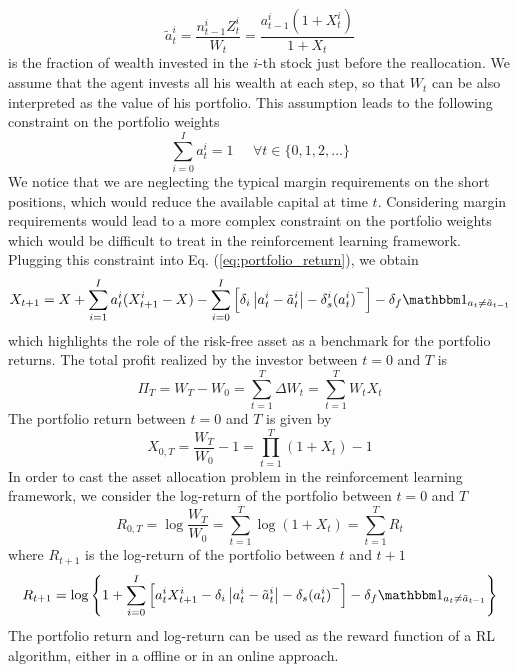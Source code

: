 \begin{equation*}
	\tilde{a}_t^i = \frac{n_{t-1}^i Z_t^i}{W_t} = \frac{a_{t-1}^i (1+X_t^i)}
	{1 + X_t}
\end{equation*}
is the fraction of wealth invested in the $i$-th stock just before the 
reallocation. We assume that the agent invests all his wealth at each step, so 
that $W_t$ can be also interpreted as the value of his portfolio. This 
assumption leads to the following constraint on the portfolio weights
\begin{equation}
	\sum^{I}_{i=0} a_t^i = 1 \;\;\;\;\; \forall t \in \{0, 1, 2, \ldots\}
\end{equation}
We notice that we are neglecting the typical margin requirements on the short
positions, which would reduce the available capital at time $t$. Considering
margin requirements would lead to a more complex constraint on the portfolio
weights which would be difficult to treat in the reinforcement learning
framework. Plugging this constraint into Eq. (\ref{eq:portfolio_return}), we
obtain
\begin{equation}\label{eq:portfolio_return_benchmark}
	X_{t+1} = X + \sum^{I}_{i=1} a_t^i (X_{t+1}^i - X) - \sum^{I}_{i=0}
	\left[\delta_i \left| a_t^i - \tilde{a}_t^i \right| - \delta_s^i
	{(a_t^i)}^-\right] - \delta_f \ind{{a}_t \neq \tilde{{a}}_{t-1}}   
\end{equation}
which highlights the role of the risk-free asset as a benchmark for the 
portfolio returns. The total profit realized by the investor between $t=0$ and
$T$ is 
\begin{equation*}
	\Pi_T = W_T - W_0 = \sum^{T}_{t=1} \Delta W_t = \sum^{T}_{t=1} W_t X_t  
\end{equation*}
The portfolio return between $t=0$ and $T$ is given by
\begin{equation*}
	X_{0,T} = \frac{W_T}{W_0} - 1 = \prod_{t=1}^T (1+X_t) - 1
\end{equation*}
In order to cast the asset allocation problem in the reinforcement learning
framework, we consider the log-return of the portfolio between $t=0$ and $T$
\begin{equation}
	R_{0,T} = \log \frac{W_T}{W_0} = \sum^{T}_{t=1} \log(1+X_t) = \sum_{t=1}^T
	R_t
\end{equation}
where $R_{t+1}$ is the log-return of the portfolio between $t$ and $t+1$
\begin{equation}
	R_{t+1} = \log \left\{ 1 + \sum^{I}_{i=0} \left[ a_t^i X_{t+1}^i - \delta_i
	\left| a_t^i - \tilde{a}_t^i \right| - \delta_s {(a_t^i)}^- \right] -
	\delta_f \ind{{a}_t \neq \tilde{{a}}_{t-1}}\right\}
\end{equation}
The portfolio return and log-return can be used as the reward function of a
RL algorithm, either in a offline or in an online approach.

